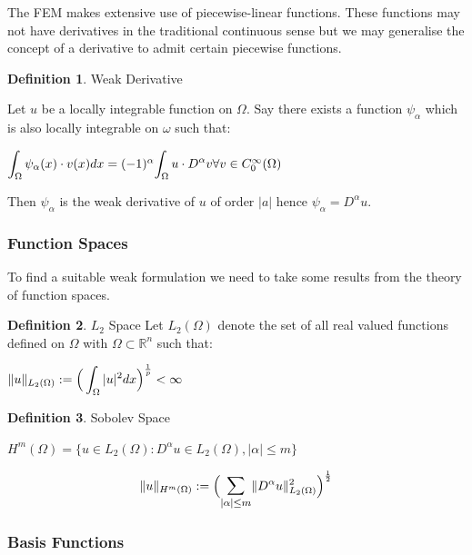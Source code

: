\documentclass{uonmathreport}
\theoremstyle{definition}
\newtheorem{definition}{Definition}[section]
\theoremstyle{problem}
\theoremstyle{theorem}
\begin{document}
The FEM makes extensive use of piecewise-linear functions. These functions may not have derivatives in the traditional continuous sense but we may generalise the concept of a derivative to admit certain piecewise functions.

\begin{definition}{Weak Derivative} \label{def:weak derivative}

Let $u$ be a locally integrable  function on $\Omega$. Say there exists a function $\psi_\alpha$ which is also locally integrable on $\omega$ such that:

$\mathlarger{\int_\Omega  \psi_\alpha(x) \cdot v(x) dx} = (-1)^{\alpha} \mathlarger{\int_\Omega  u \cdot D^{\alpha} v} \forall v \in C^\infty_0(\Omega)$

Then $\psi_\alpha$ is the weak derivative of $u$ of order $|a|$ hence $\psi_\alpha = D^\alpha u$. 
\end{definition}

\subsubsection{Function Spaces} \label{subsec:Function Spaces}

To find a suitable weak formulation we need to take some results from the theory of function spaces.

\begin{definition}{$L_2$ Space}
Let $L_2(\Omega)$ denote the set of all real valued functions defined on $\Omega$ with $\Omega \subset \mathbb{R}^n$ such that:
\begin{center}
$\|u\|_{L_2(\Omega)} := \mathlarger{\Big(\int_\Omega  { |u|^2 } dx\Big)}^{\frac{1}{p}} < \infty$
\end{center}
\end{definition}


\begin{definition}{Sobolev Space}

$H^{m}(\Omega) = \{ u \in L_2(\Omega) : D^{\alpha} u \in L_2(\Omega), |\alpha| \leq m \}$

$$\|u\|_{H^m(\Omega)} :=  \Big(\mathlarger{\sum_{|\alpha|\leq m}}\|D^{\alpha}u\|^2_{L_2(\Omega)} \Big)^{\frac{1}{2}} $$
\end{definition}


\subsubsection{Basis Functions} \label{subsec:basis}
\end{document}
